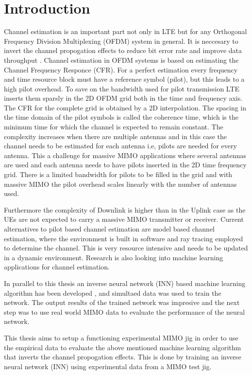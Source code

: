 \chapter{Introduction}
\label{ch:intro}

Channel estimation is an important part not only in LTE but for any Orthogonal Frequency Division Multiplexing (OFDM) system in general. It is neccesary to invert the channel propogation effects to reduce bit error rate and improve data throughput \cite{ChEst,CHEstPilotBased}. Channel estimation in OFDM systems is based on estimating the Channel Frequency Responce (CFR). For a perfect estimation every frequency and time resource block must have a reference symbol (pilot), but this leads to a high pilot overhead. To save on the bandwidth used for pilot transmission LTE inserts them sparsly in the 2D OFDM grid both in the time and frequency axis. The CFR for the complete grid is obtained by a 2D interpolation. The spacing in the time domain of the pilot symbols is called the coherence time, which is the minimum time for which the channel is expected to remain constant. The complexity increases when there are multiple antennas and in this case the channel needs to be estimated for each antenna i.e, pilots are needed for every antenna. This a challenge for massive MIMO applications where several antennas are used and each antenna needs to have pilots inserted in the 2D time frequency grid. There is a limited bandwidth for pilots to be filled in the grid and with massive MIMO the pilot overhead scales linearly with the number of antennas used.

Furthermore the complexity of Downlink is higher than in the Uplink case as the UEs are not expected to carry a massive MIMO transmitter or receiver. Current alternatives to pilot based channel estimation are model based channel estimation, where the environment is built in software and ray tracing employed to determine the channel. This is very resource intensive and needs to be updated in a dynamic environment. Research is also looking into machine learning applications for channel estimation. 

In parallel to this thesis an inverse neural network (INN) based machine learning algorithm has been developed \cite{JMMLINN}, and simultaed data was used to train the network. The output results of the trained network was impresive and the next step was to use real world MIMO data to evaluate the performance of the neural network.

This thesis aims to setup a functioning experimental MIMO jig in order to use the empirical data to evaluate the above mentioned machine learning algorithm that inverts the channel propogation effects. This is done by training an inverse neural network (INN) using experimental data from a MIMO test jig. \\

